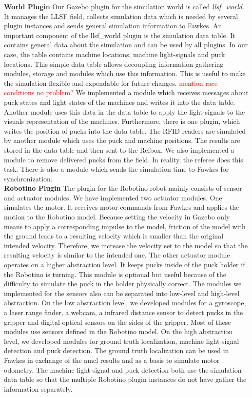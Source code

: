 \textbf{World Plugin}
Our Gazebo plugin for the simulation world is called \textit{llsf\_world}. It manages the LLSF field, collects simulation data which is needed by several plugin instances and sends general simulation information to Fawkes. An important component of the llsf\_world plugin is the simulation data table. It contains general data about the simulation and can be used by all plugins. In our case, the table contains machine locations, machine light-signals and puck locations. This simple data table allows decoupling information gathering modules, storage and modules which use this information. This is useful to make the simulation flexible and expendable for future changes. \textcolor{red}{mention race conditions no problem?} We implemented a module which receives messages about puck states and light states of the machines and writes it into the data table. Another module uses this data in the data table to apply the light-signals to the visuals representation of the machines. Furthermore, there is one plugin, which writes the position of pucks into the data table. The RFID readers are simulated by another module which uses the puck and machine positions. The results are stored in the data table and then sent to the Refbox. We also implemented a module to remove delivered pucks from the field. In reality, the referee does this task. There is also a module which sends the simulation time to Fawkes for synchronization.
\\
\textbf{Robotino Plugin}
The plugin for the Robotino robot mainly consists of sensor and actuator modules. We have implemented two actuator modules. One simulates the motor. It receives motor commands from Fawkes and applies the motion to the Robotino model. Because setting the velocity in Gazebo only means to apply a corresponding impulse to the model, friction of the model with the ground leads to a resulting velocity which is smaller than the original intended velocity. Therefore, we increase the velocity set to the model so that the resulting velocity is similar to the intended one. The other actuator module operates on a higher abstraction level. It keeps pucks inside of the puck holder if the Robotino is turning. This module is optional but useful because of the difficulty to simulate the puck in the holder physically correct. The modules we implemented for the sensors also can be separated into low-level and high-level abstraction. On the low abstraction level, we developed modules for a gyroscope, a laser range finder, a webcam, a infrared distance sensor to detect pucks in the gripper and digital optical sensors on the sides of the gripper. Most of these modules use sensors defined in the Robotino model. On the high abstraction level, we developed modules for ground truth localization, machine light-signal detection and puck detection. The ground truth localization can be used in Fawkes in exchange of the amcl results and as a basis to simulate motor odometry. The machine light-signal and puck detection both use the simulation data table so that the multiple Robotino plugin instances do not have gather the information separately.



